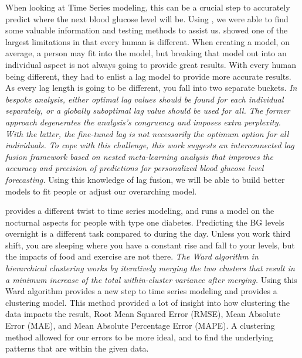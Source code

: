 \documentclass{article}
\begin{document}
When looking at Time Series modeling, this can be a crucial step to accurately predict where the next blood glucose level will be. Using \cite{TimeSeriesLag}, we were able to find some valuable information and testing methods to assist us. \cite{TimeSeriesLag} showed one of the largest limitations in that every human is different. When creating a model, on average, a person may fit into the model, but breaking that model out into an individual aspect is not always going to provide great results. With every human being different, they had to enlist a lag model to provide more accurate results. As every lag length is going to be different, you fall into two separate buckets. \textit{In bespoke analysis, either optimal lag values should be found for each individual separately, or a globally suboptimal lag value should be used for all. The former approach degenerates the analysis’s congruency and imposes extra perplexity. With the latter, the fine-tuned lag is not necessarily the optimum option for all individuals. To cope with this challenge, this work suggests an interconnected lag fusion framework based on nested meta-learning analysis that improves the accuracy and precision of predictions for personalized blood glucose level forecasting.} \cite{TimeSeriesLag} Using this knowledge of lag fusion, we will be able to build better models to fit people or adjust our overarching model.

\cite{TimeSeriesCluster} provides a different twist to time series modeling, and runs a model on the nocturnal aspects for people with type one diabetes. Predicting the BG levels overnight is a different task compared to during the day. Unless you work third shift, you are sleeping where you have a constant rise and fall to your levels, but the impacts of food and exercise are not there. \textit{The Ward algorithm in hierarchical clustering works by iteratively merging the two clusters that result in a minimum increase of the total within-cluster variance after merging.} \cite{TimeSeriesCluster} Using this Ward algorithm provides a new step to time series modeling and provides a clustering model. This method provided a lot of insight into how clustering the data impacts the result, Root Mean Squared Error (RMSE), Mean Absolute Error (MAE), and Mean Absolute Percentage Error (MAPE). A clustering method allowed for our errors to be more ideal, and to find the underlying patterns that are within the given data.
\end{document}
